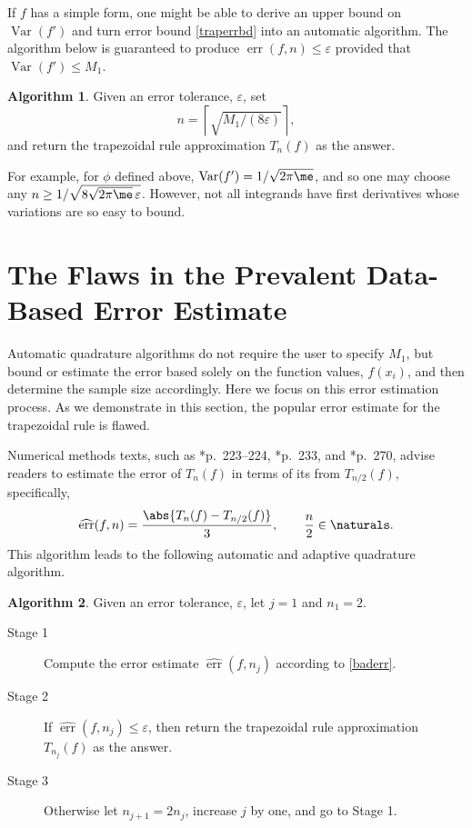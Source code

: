\documentclass[]{amsart}
\DeclareMathOperator{\Var}{Var}
\DeclareMathOperator{\err}{err}
\newcommand{\herr}{\widehat{\err}}
\theoremstyle{definition}
\newtheorem{algo}{Algorithm}
\theoremstyle{remark}
\begin{document}
If $f$ has a simple form, one might be able to derive an upper bound on $\Var(f')$ and turn error bound \eqref{traperrbd} into an automatic algorithm.  The algorithm below is guaranteed to produce $\err(f,n)\le \varepsilon$ provided that $\Var(f') \le M_1$.  

\begin{algo} Given an error tolerance, $\varepsilon$, set 
\begin{equation}\label{algo1n}
n = \left \lceil \sqrt{M_1/(8\varepsilon)} \right \rceil,
\end{equation}
and return the trapezoidal rule approximation $T_n(f)$ as the answer.
\end{algo}

For example, for $\phi$ defined above, $\Var(f')=1/\sqrt{2 \pi \me}$, and so one may choose any $n \ge 1/\sqrt{8\sqrt{2 \pi \me} \, \varepsilon}$.  However, not all integrands have first derivatives whose variations are so easy to bound.  

\section{The Flaws in the Prevalent Data-Based Error Estimate}
Automatic quadrature algorithms do not require the user to specify $M_1$, but bound or estimate the error based solely on the function values, $f(x_i)$, and then determine the sample size accordingly.  Here we focus on this error estimation process.  As we demonstrate in this section, the popular error estimate for the trapezoidal rule is flawed. 

Numerical methods texts, such as *{p.\ 223--224}, *{p.\ 233}, and  *{p.\ 270}, advise readers to estimate the error of $T_n(f)$ in terms of its from $T_{n/2}(f)$, specifically,
\begin{equation}\label{baderr}
\herr(f,n) = \frac{\abs{T_n(f) - T_{n/2}(f)}}{3}, \qquad \frac n2 \in \naturals.
\end{equation}
This algorithm leads to the following automatic and adaptive quadrature algorithm.

\begin{algo} \label{baderralgo} Given an error tolerance, $\varepsilon$, let $j=1$ and $n_1=2$.

\begin{description} 

\item[Stage 1] Compute the error estimate $\herr(f,n_j)$ according to \eqref{baderr}.

\item [Stage 2] If $\herr(f,n_j) \le \varepsilon$, then return the trapezoidal rule approximation $T_{n_j}(f)$ as the answer.  

\item [Stage 3] Otherwise let $n_{j+1}=2 n_j$, increase $j$ by one, and go to Stage 1.

\end{description}

\end{algo}
\end{document}
